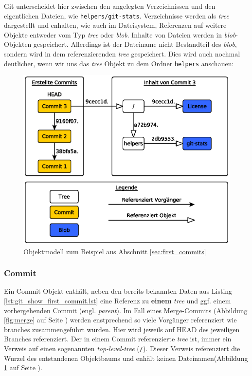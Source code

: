 Git unterscheidet hier zwischen den angelegten Verzeichnissen und den
eigentlichen Dateien, wie \texttt{helpers/git-stats}. Verzeichnisse werden als
\textit{tree} dargestellt und enhalten, wie auch im Dateisystem, Referenzen auf
weitere Objekte entweder vom Typ \textit{tree} oder \textit{blob}.  Inhalte von
Dateien werden in \textit{blob}-Objekten gespeichert. Allerdings ist der
Dateiname nicht Bestandteil des \textit{blob}, sondern wird in dem
referenzierenden \textit{tree} gespeichert. Dies wird auch nochmal deutlicher,
wenn wir uns das \textit{tree} Objekt zu dem Ordner \texttt{helpers} anschauen:



\begin{figure}[h]
  \centering
  \includegraphics[scale=0.75]{images/objectmodel.eps}
  \caption{Objektmodell zum Beispiel aus Abschnitt \ref{sec:first_commits}\cite[S.~53]{gitosp}}
  \label{fig:objectmodel}
\end{figure}

\subsubsection{Commit}\label{sec:commitobject}
Ein Commit-Objekt enthält, neben den bereits bekannten Daten aus Listing
\ref{lst:git_show_first_commit.lst} eine Referenz zu \textbf{einem}
\textit{tree} und ggf. einem vorhergehenden Commit (engl.  \textit{parent}). Im Fall
eines Merge-Commits (Abbildung \ref{fig:merge} auf Seite \pageref{fig:merge})
werden enstprechend so viele Vorgänger referenziert wie branches
zusammengeführt wurden. Hier wird jeweils auf \gls{HEAD} des jeweiligen
Branches referenziert. Der in einem Commit referenzierte \textit{tree} ist,
immer ein Verweis auf einen sogenannten \textit{top-level-tree} (\texttt{/}).
Dieser Verweis referenziert die Wurzel des entstandenen Objektbaums und enhält
keinen Dateinamen(Abbildung \ref{fig:objectmodel} auf Seite \pageref{fig:objectmodel}).

